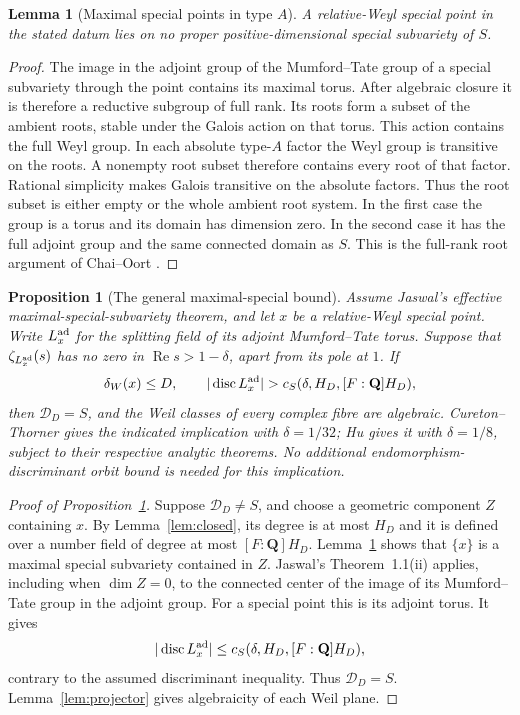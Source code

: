 \documentclass[11pt]{article}
\newtheorem{proposition}[theorem]{Proposition}
\newtheorem{lemma}[theorem]{Lemma}
\theoremstyle{definition}
\theoremstyle{remark}
\newcommand{\Q}{\mathbf Q}
\begin{document}
\begin{lemma}[Maximal special points in type $A$]\label{lem:weyl}
A relative-Weyl special point in the stated datum lies on no
proper positive-dimensional special subvariety of $S$.
\end{lemma}
\begin{proof}
The image in the adjoint group of the Mumford--Tate group of a
special subvariety through the point contains its maximal torus.
After algebraic closure it is therefore a reductive subgroup of
full rank. Its roots form a subset of the ambient roots, stable
under the Galois action on that torus. This action contains the
full Weyl group. In each absolute type-$A$ factor the Weyl group
is transitive on the roots. A nonempty root subset therefore
contains every root of that factor. Rational simplicity makes
Galois transitive on the absolute factors. Thus the root subset
is either empty or the whole ambient root system. In the first
case the group is a torus and its domain has dimension zero. In
the second case it has the full adjoint group and the same
connected domain as $S$. This is the full-rank root argument
of Chai--Oort \cite[Lemma 6.3, pp.~621--622]{ChaiOort}.
\end{proof}

\begin{proposition}[The general maximal-special bound]\label{prop:general-forcing}
Assume Jaswal's effective maximal-special-subvariety theorem, and
let $x$ be a relative-Weyl special point. Write $L_x^{\rm ad}$ for
the splitting field of its adjoint Mumford--Tate torus. Suppose
that $\zeta_{L_x^{\rm ad}}(s)$ has no zero in
$\operatorname{Re}s>1-\delta$, apart from its pole at $1$.
If
\[
 \delta_W(x)\leq D,\qquad
 |\operatorname{disc}L_x^{\rm ad}|
   >c_S(\delta,H_D,[F:\Q]H_D),
\]
then $\mathcal D_D=S$, and the Weil classes of every complex fibre
are algebraic. Cureton--Thorner gives the indicated implication
with $\delta=1/32$; Hu gives it with $\delta=1/8$, subject to their
respective analytic theorems. No additional endomorphism-discriminant orbit bound is
needed for this implication.
\end{proposition}

\begin{proof}[Proof of Proposition~\ref{prop:general-forcing}]
Suppose $\mathcal D_D\ne S$, and choose a geometric component
$Z$ containing $x$. By Lemma~\ref{lem:closed}, its degree is at
most $H_D$ and it is defined over a number field of degree at
most $[F:\Q]H_D$. Lemma~\ref{lem:weyl} shows that $\{x\}$
is a maximal special subvariety contained in $Z$. Jaswal's
Theorem~1.1(ii) applies, including when $\dim Z=0$, to the
connected center of the image of its Mumford--Tate group in the
adjoint group. For a special point this is its adjoint torus.
It gives
\[
 |\operatorname{disc}L_x^{\rm ad}|\leq
 c_S(\delta,H_D,[F:\Q]H_D),
\]
contrary to the assumed discriminant inequality. Thus $\mathcal D_D=S$.
Lemma~\ref{lem:projector} gives algebraicity of each Weil plane.
\end{proof}
\end{document}
